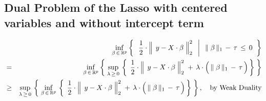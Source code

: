 \subsection{Dual Problem of the Lasso with centered variables and without intercept term}
\vskip 0.0cm
\noindent
\begin{eqnarray*}
&&
	\underset{\beta\,\in\,\Re^{p}}{\inf}
	\left\{\;\;
		\left.
		\dfrac{1}{2}
		\cdot
		\left\Vert\;\, y \overset{{\color{white}.}}{-} X\cdot\beta \;\right\Vert_{2}^{2}
		\;\;\,\right\vert\;\;
		\Vert\;\beta\,\Vert_{1} \, - \, \tau \, \leq \, 0
		\;\;\right\}
\\
& = &
	\underset{\beta\,\in\,\Re^{p}}{\inf}
	\left\{\;
		\underset{\lambda\,\geq\,0}{\sup}\,
		\left\{\;\,
			\dfrac{1}{2}
			\cdot
			\left\Vert\;\, y \overset{{\color{white}.}}{-} X\cdot\beta \;\right\Vert_{2}^{2}
			\; + \,
			\lambda
			\cdot
			\left(\, \Vert\;\beta\,\Vert_{1} \, \overset{{\color{white}.}}{-} \, \tau \,\right)
			\,\right\}
		\;\right\}
\\
& \geq &
	\underset{\lambda\,\geq\,0}{\sup}\,
	\left\{\;
		\underset{\beta\,\in\,\Re^{p}}{\inf}\,
		\left\{\;\,
			\dfrac{1}{2}
			\cdot
			\left\Vert\;\, y \overset{{\color{white}.}}{-} X\cdot\beta \;\right\Vert_{2}^{2}
			\; + \,
			\lambda
			\cdot
			\left(\, \Vert\;\beta\,\Vert_{1} \, \overset{{\color{white}.}}{-} \, \tau \,\right)
			\,\right\}
		\;\right\},
	\quad
	\textnormal{by Weak Duality}
\end{eqnarray*}



